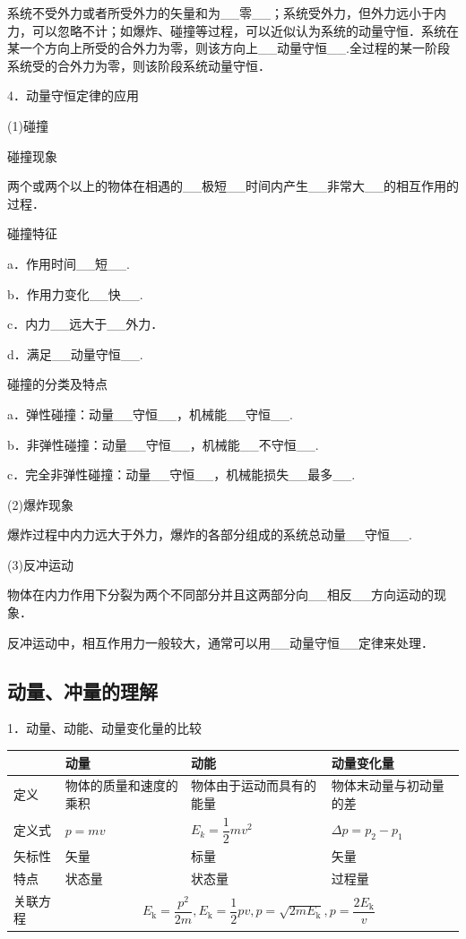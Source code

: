 系统不受外力或者所受外力的矢量和为\_\_零\_\_；系统受外力，但外力远小于内力，可以忽略不计；如爆炸、碰撞等过程，可以近似认为系统的动量守恒．系统在某一个方向上所受的合外力为零，则该方向上\_\_动量守恒\_\_.全过程的某一阶段系统受的合外力为零，则该阶段系统动量守恒．

4．动量守恒定律的应用

(1)碰撞

碰撞现象

两个或两个以上的物体在相遇的\_\_极短\_\_时间内产生\_\_非常大\_\_的相互作用的过程．

碰撞特征

a．作用时间\_\_短\_\_.

b．作用力变化\_\_快\_\_.

c．内力\_\_远大于\_\_外力．

d．满足\_\_动量守恒\_\_.

碰撞的分类及特点

a．弹性碰撞：动量\_\_守恒\_\_，机械能\_\_守恒\_\_.

b．非弹性碰撞：动量\_\_守恒\_\_，机械能\_\_不守恒\_\_.

c．完全非弹性碰撞：动量\_\_守恒\_\_，机械能损失\_\_最多\_\_.

(2)爆炸现象

爆炸过程中内力远大于外力，爆炸的各部分组成的系统总动量\_\_守恒\_\_.

(3)反冲运动

物体在内力作用下分裂为两个不同部分并且这两部分向\_\_相反\_\_方向运动的现象．

反冲运动中，相互作用力一般较大，通常可以用\_\_动量守恒\_\_定律来处理．

\newpage
\subsection{动量、冲量的理解}

1．动量、动能、动量变化量的比较

\begin{longtable}[]{@{}llll@{}}
\toprule
& 
动量
&
动能
&动量变化量
\tabularnewline
\midrule
\endhead
定义 & 物体的质量和速度的乘积 & 物体由于运动而具有的能量 &
物体末动量与初动量的差\tabularnewline
定义式 & $p=mv$ & $E_k=\dfrac{1}{2} mv^2$ & $\Delta p=p_2-p_1$\tabularnewline
矢标性 & 矢量 & 标量 & 矢量\tabularnewline
特点 & 状态量 & 状态量 & 过程量\tabularnewline
关联方程 &\multicolumn{3}{c}{ $E_{\mathrm{k}}=\dfrac{p^{2}}{2 m}, E_{\mathrm{k}}=\dfrac{1}{2} p v, p=\sqrt{2 m E_{\mathrm{k}}}, p=\dfrac{2 E_{\mathrm{k}}}{v}$}\tabularnewline
\bottomrule
\end{longtable}

